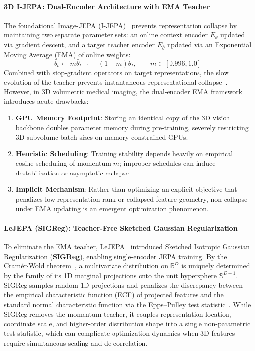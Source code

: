 \documentclass{article}
\begin{document}
\paragraph{3D I-JEPA: Dual-Encoder Architecture with EMA Teacher}
The foundational Image-JEPA (I-JEPA)~\citep{assran2023ijepa} prevents representation collapse by maintaining two separate parameter sets: an online context encoder $E_\theta$ updated via gradient descent, and a target teacher encoder $E_{\bar{\theta}}$ updated via an Exponential Moving Average (EMA) of online weights:
\begin{equation}
    \bar{\theta}_t \leftarrow m \bar{\theta}_{t-1} + (1 - m) \theta_t, \qquad m \in [0.996, 1.0]
\end{equation}
Combined with stop-gradient operators on target representations, the slow evolution of the teacher prevents instantaneous representational collapse~\citep{grill2020bootstrap}. However, in 3D volumetric medical imaging, the dual-encoder EMA framework introduces acute drawbacks:
\begin{enumerate}
    \item \textbf{GPU Memory Footprint}: Storing an identical copy of the 3D vision backbone doubles parameter memory during pre-training, severely restricting 3D subvolume batch sizes on memory-constrained GPUs.
    \item \textbf{Heuristic Scheduling}: Training stability depends heavily on empirical cosine scheduling of momentum $m$; improper schedules can induce destabilization or asymptotic collapse.
    \item \textbf{Implicit Mechanism}: Rather than optimizing an explicit objective that penalizes low representation rank or collapsed feature geometry, non-collapse under EMA updating is an emergent optimization phenomenon.
\end{enumerate}

\paragraph{LeJEPA (SIGReg): Teacher-Free Sketched Gaussian Regularization}
To eliminate the EMA teacher, LeJEPA~\citep{balestriero2025lejepa} introduced Sketched Isotropic Gaussian Regularization (\textbf{SIGReg}), enabling single-encoder JEPA training. By the Cram\'er-Wold theorem~\citep{cramer1936theorems}, a multivariate distribution on $\mathbb{R}^D$ is uniquely determined by the family of its 1D marginal projections onto the unit hypersphere $\mathbb{S}^{D-1}$. SIGReg samples random 1D projections and penalizes the discrepancy between the empirical characteristic function (ECF) of projected features and the standard normal characteristic function via the Epps--Pulley test statistic~\citep{epps1983test}. While SIGReg removes the momentum teacher, it couples representation location, coordinate scale, and higher-order distribution shape into a single non-parametric test statistic, which can complicate optimization dynamics when 3D features require simultaneous scaling and de-correlation.
\end{document}

